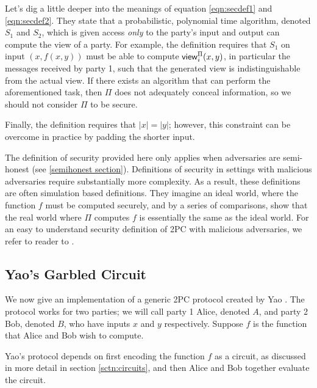 \documentclass[12pt,twoside]{reedthesis}
\newcommand{\viewrv}{{\sf view}}
\begin{document}
\begin{description}
    Let's dig a little deeper into the meanings of equation \ref{eqn:secdef1} and \ref{eqn:secdef2}.
    They state that a probabilistic, polynomial time algorithm, denoted $S_1$ and $S_2$, which is given access \textit{only} to the party's input and output can compute the view of a party.
    For example, the definition requires that $S_1$ on input $(x, f(x,y))$ must be able to compute $\viewrv^{\Pi}_i(x,y)$, in particular the messages received by party 1, such that the generated view is indistinguishable from the actual view.
If there exists an algorithm that can perform the aforementioned task, then $\Pi$ does not adequately conceal information, so we should not consider $\Pi$ to be secure.

    Finally, the definition requires that $|x| = |y|$; however, this constraint can be overcome in practice by padding the shorter input.
\end{description}

The definition of security provided here only applies when adversaries are semi-honest (see \ref{semihonest section}).
Definitions of security in settings with malicious adversaries require substantially more complexity.
As a result, these definitions are often simulation based definitions.
They imagine an ideal world, where the function $f$ must be computed securely, and by a series of comparisons, show that the real world where $\Pi$ computes $f$ is essentially the same as the ideal world.
For an easy to understand security definition of 2PC with malicious adversaries, we refer to reader to \cite{lindell2009}.

\subsection{Yao's Garbled Circuit}
We now give an implementation of a generic 2PC protocol created by Yao \cite{yao}.
The protocol works for two parties; we will call party 1 Alice, denoted $A$, and party 2 Bob, denoted $B$, who have inputs $x$ and $y$ respectively.
Suppose $f$ is the function that Alice and Bob wish to compute.

Yao's protocol depends on first encoding the function $f$ as a circuit, as discussed in more detail in section \ref{sctn:circuits}, and then Alice and Bob together evaluate the circuit.

\end{document}
